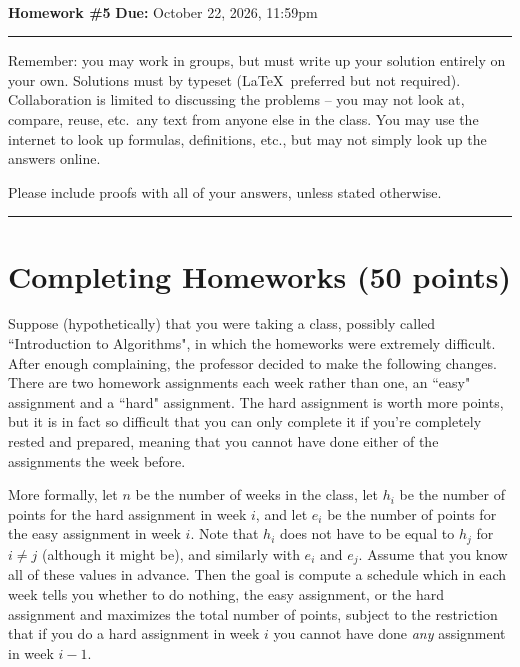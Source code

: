 \documentclass[11pt]{article}
\begin{document}
\\ 
{{\bf Homework \#5}} \hfill {{\bf Due:} October 22, 2026, 11:59pm} \\
\rule[0.1in]{\textwidth}{0.4pt}

Remember: you may work in groups, but must write up your solution entirely on your own.  Solutions must by typeset (\LaTeX\ preferred but not required).  Collaboration is limited to discussing the problems -- you may not look at, compare, reuse, etc.~any text from anyone else in the class.  You may use the internet to look up formulas, definitions, etc., but may not simply look up the answers online.  

Please include proofs with all of your answers, unless stated otherwise.

\noindent \rule[0.1in]{\textwidth}{0.4pt}

\section{Completing Homeworks (50 points)}

Suppose (hypothetically) that you were taking a class, possibly called ``Introduction to Algorithms", in which the homeworks were extremely difficult.  After enough complaining, the professor decided to make the following changes.  There are two homework assignments each week rather than one, an ``easy" assignment and a ``hard" assignment.  The hard assignment is worth more points, but it is in fact so difficult that you can only complete it if you're completely rested and prepared, meaning that you cannot have done either of the assignments the week before.  

More formally, let $n$ be the number of weeks in the class, let $h_i$ be the number of points for the hard assignment in week $i$, and let $e_i$ be the number of points for the easy assignment in week $i$.  Note that $h_i$ does not have to be equal to $h_j$ for $i \neq j$ (although it might be), and similarly with $e_i$ and $e_j$.  Assume that you know all of these values in advance.  Then the goal is compute a schedule which in each week tells you whether to do nothing, the easy assignment, or the hard assignment and maximizes the total number of points, subject to the restriction that if you do a hard assignment in week $i$ you cannot have done \emph{any} assignment in week $i-1$. 
\end{document}
